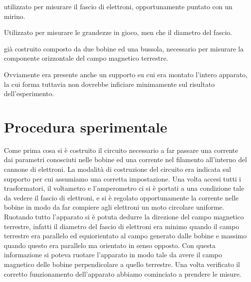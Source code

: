 \documentclass[a4paper,11pt]{article}
\begin{document}
\begin{description}[align=left]
		\item [Calibro elettronico] utilizzato per misurare il fascio di elettroni, opportunamente puntato con un mirino.
		
		\item[Metro] Utilizzato per misurare le grandezze in gioco, men che il diametro del fascio.
		
		\item [Un apparato sperimentale] già costruito composto da due bobine ed una bussola, necessario per misurare la componente orizzontale del campo magnetico terrestre.
		
		Ovviamente era presente anche un supporto su cui era montato l'intero apparato, la cui forma tuttavia non dovrebbe inficiare minimamente sul risultato dell'esperimento.
		
	\end{description}


	\section{Procedura sperimentale}
	
	Come prima cosa si è costruito il circuito necessario a far passare una corrente dai parametri conosciuti nelle bobine ed una corrente nel filamento all'interno del cannone di elettroni. La modalità di costruzione del circuito era indicata sul supporto per cui assumiamo una corretta impostazione. Una volta accesi tutti i trasformatori, il voltametro e l'amperometro ci si è portati a una condizione tale da vedere il fascio di elettroni, e si è regolato opportunamente la corrente nelle bobine in modo da far compiere agli elettroni un moto circolare uniforme. Ruotando tutto l'apparato si è potuta dedurre la direzione del campo magnetico terrestre, infatti il diametro del fascio di elettroni era minimo quando il campo terrestre era parallelo ed equiorientato al campo generato dalle bobine e massimo quando questo era parallelo ma orientato in senso opposto. Con questa informazione si poteva ruotare l'apparato in modo tale da avere il campo magnetico delle bobine perpendicolare a quello terrestre. Una volta verificato il corretto funzionamento dell'apparato abbiamo cominciato a prendere le misure.
	
\end{document}
